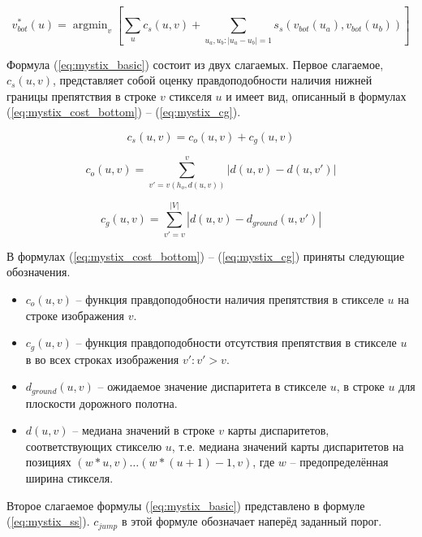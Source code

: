 \documentclass[aps,%
14pt,%
final,%
oneside,
onecolumn,%
musixtex, %
superscriptaddress,%
centertags]{extarticle} %
\DeclareMathOperator*{\argmin}{argmin}
\begin{document}
\begin{equation}\label{eq:mystix_basic}
v_{bot}^*(u) = \argmin_{v}[\sum_u c_s(u, v) + \sum_{u_a, u_b: |u_a - u_b| = 1} s_s(v_{bot}(u_a), v_{bot}(u_b))]
\end{equation}

Формула (\ref{eq:mystix_basic}) состоит из двух слагаемых. Первое слагаемое, $c_s(u, v)$, представляет собой оценку правдоподобности наличия нижней границы препятствия в строке $v$ стикселя $u$ и имеет вид, описанный в формулах (\ref{eq:mystix_cost_bottom}) -- (\ref{eq:mystix_cg}). 

\begin{equation}\label{eq:mystix_cost_bottom}
c_s(u, v) = c_o(u, v) + c_g(u, v)
\end{equation}

\begin{equation}\label{eq:mystix_co}
c_o(u, v) = \sum_{v'=v(h_o, d(u, v))}^{v} |d(u, v) - d(u, v')|
\end{equation}

\begin{equation}\label{eq:mystix_cg}
c_g(u, v) = \sum_{v'=v}^{|V|} |d(u, v) - d_{ground}(u, v')|
\end{equation}

В формулах (\ref{eq:mystix_cost_bottom}) -- (\ref{eq:mystix_cg}) приняты следующие обозначения.

\begin{itemize}

\item $c_o(u, v)$ -- функция правдоподобности наличия препятствия в стикселе $u$ на строке изображения $v$.

\item $c_g(u, v)$ -- функция правдоподобности отсутствия препятствия в стикселе $u$ в во всех строках изображения $v' : v' > v$.

\item $d_{ground}(u, v)$ -- ожидаемое значение диспаритета в стикселе $u$, в строке $u$ для плоскости дорожного полотна.

\item $d(u, v)$ -- медиана значений в строке $v$ карты диспаритетов, соответствующих стикселю $u$, т.е. медиана значений карты диспаритетов на позициях $(w * u, v)\dots (w * (u + 1) - 1, v)$, где $w$ -- предопределённая ширина стикселя.

\end{itemize}

Второе слагаемое формулы (\ref{eq:mystix_basic}) представлено в формуле (\ref{eq:mystix_ss}). $c_{jump}$ в этой формуле обозначает наперёд заданный порог.
\end{document}
